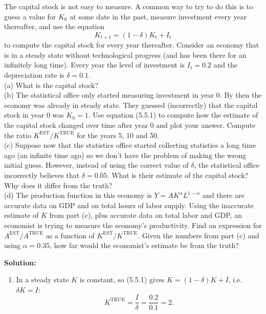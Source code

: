 \documentclass[12pt, letterpaper]{article}
\newcommand{\EST}{^{\mathrm{EST}}}
\newcommand{\TRUE}{^{\mathrm{TRUE}}}
\begin{document}
\begin{tcolorbox}[evenbox,title={Problem 5.4 \quad Measurement of the Capital Stock}]
\begin{tcolorbox}[questionbox]
The capital stock is not easy to measure. A common way to try to do this is to guess a value
for $K_0$ at some date in the past, measure investment every year thereafter, and use the
equation
\[
K_{t+1}=(1-\delta)K_t+I_t
\tag{5.5.1}
\]
to compute the capital stock for every year thereafter. Consider an economy that is in a
steady state without technological progress (and has been there for an infinitely long
time). Every year the level of investment is $I_t=0.2$ and the depreciation rate is
$\delta=0.1$.\\[3pt]
(a) What is the capital stock?\\[3pt]
(b) The statistical office only started measuring investment in year 0. By then the economy
was already in steady state. They guessed (incorrectly) that the capital stock in year 0 was
$K_0=1$. Use equation (5.5.1) to compute how the estimate of the capital stock changed over
time after year 0 and plot your answer. Compute the ratio $K\EST/K\TRUE$ for the years 5, 10
and 50.\\[3pt]
(c) Suppose now that the statistics office started collecting statistics a long time ago (an
infinite time ago) so we don't have the problem of making the wrong initial guess. However,
instead of using the correct value of $\delta$, the statistical office incorrectly believes
that $\delta=0.05$. What is their estimate of the capital stock? Why does it differ from the
truth?\\[3pt]
(d) The production function in this economy is $Y=AK^{\alpha}L^{1-\alpha}$ and there are
accurate data on GDP and on total hours of labor supply. Using the inaccurate estimate of
$K$ from part (c), plus accurate data on total labor and GDP, an economist is trying to
measure the economy's productivity. Find an expression for $A\EST/A\TRUE$ as a function of
$K\EST/K\TRUE$. Given the numbers from part (c) and using $\alpha=0.35$, how far would the
economist's estimate be from the truth?
\end{tcolorbox}

\textbf{Solution:}
\begin{enumerate}

\item In a steady state $K$ is constant, so (5.5.1) gives $K=(1-\delta)K+I$, i.e.
$\delta K=I$:
\[
\boxed{K\TRUE=\frac{I}{\delta}=\frac{0.2}{0.1}=2} .
\]


\end{enumerate}
\end{tcolorbox}
\end{document}

